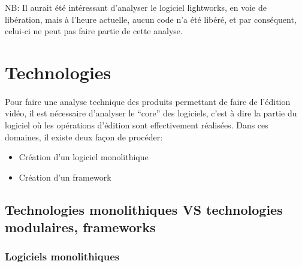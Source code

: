 NB: Il aurait été intéressant d'analyser le logiciel lightworks,
en voie de libération, mais à l'heure actuelle, aucun code n'a été
libéré, et par conséquent, celui-ci ne peut pas faire partie de
cette analyse.

\newpage

\section{Technologies}

\paragraph{}

Pour faire une analyse technique des produits permettant de faire
de l'édition vidéo, il est nécessaire d'analyser le ``core'' des
logiciels, c'est à dire la partie du logiciel où les opérations
d'édition sont effectivement réalisées. Dans ces domaines, il existe
deux façon de procéder:

\begin{itemize} \setlength{\itemsep}{2mm}

  \item{Création d'un logiciel monolithique}

  \item{Création d'un framework 
   }

\end{itemize}

\subsection {Technologies monolithiques VS
technologies modulaires, frameworks}


\subsubsection{Logiciels monolithiques } %

\paragraph{}

